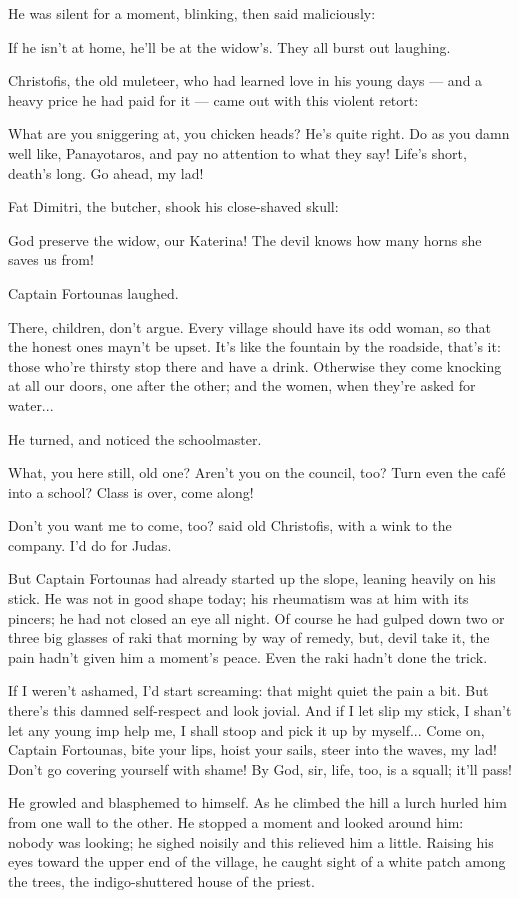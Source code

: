 \documentclass[diploma]{softlab-thesis}
\begin{document}
He was silent for a moment, blinking, then said maliciously:

If he isn’t at home, he’ll be at the widow’s. They all burst out laughing.

Christofis, the old muleteer, who had learned love in his young days --- and
a heavy price he had paid for it --- came out with this violent retort:

What are you sniggering at, you chicken heads? He’s quite right. Do as you
damn well like, Panayotaros, and pay no attention to what they say! Life’s
short, death’s long. Go ahead, my lad!

Fat Dimitri, the butcher, shook his close-shaved skull:

God preserve the widow, our Katerina! The devil knows how many horns she
saves us from!

Captain Fortounas laughed.

There, children, don’t argue. Every village should have its odd woman, so
that the honest ones mayn’t be upset. It’s like the fountain by the
roadside, that’s it: those who’re thirsty stop there and have a
drink. Otherwise they come knocking at all our doors, one after the other;
and the women, when they’re asked for water...

He turned, and noticed the schoolmaster.

What, you here still, old one? Aren’t you on the council, too? Turn even the
café into a school? Class is over, come along!

Don’t you want me to come, too? said old Christofis, with a wink to the
company. I’d do for Judas.

But Captain Fortounas had already started up the slope, leaning heavily on
his stick. He was not in good shape today; his rheumatism was at him with
its pincers; he had not closed an eye all night. Of course he had gulped
down two or three big glasses of raki that morning by way of remedy, but,
devil take it, the pain hadn’t given him a moment’s peace. Even the raki
hadn’t done the trick.

If I weren’t ashamed, I’d start screaming: that might quiet the pain a
bit. But there’s this damned self-respect and look jovial. And if I let slip
my stick, I shan’t let any young imp help me, I shall stoop and pick it up
by myself... Come on, Captain Fortounas, bite your lips, hoist your sails,
steer into the waves, my lad! Don’t go covering yourself with shame! By God,
sir, life, too, is a squall; it’ll pass!

He growled and blasphemed to himself. As he climbed the hill a lurch hurled
him from one wall to the other. He stopped a moment and looked around him:
nobody was looking; he sighed noisily and this relieved him a
little. Raising his eyes toward the upper end of the village, he caught
sight of a white patch among the trees, the indigo-shuttered house of the
priest.
\end{document}
